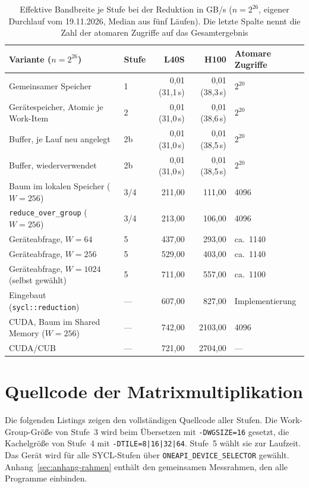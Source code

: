 \documentclass[12pt,a4paper]{article}
\begin{document}
\begin{table}[H]
\centering
\footnotesize
\setlength{\tabcolsep}{4pt}
\caption[Leistung je Stufe bei der Reduktion (GB/s)]{Effektive Bandbreite je Stufe bei der Reduktion in GB/s ($n = 2^{26}$, eigener Durchlauf vom 19.11.2026, Median aus fünf Läufen). Die letzte Spalte nennt die Zahl der atomaren Zugriffe auf das Gesamtergebnis}
\label{tab:reduktion_stufen}
\begin{tabular}{@{}llrrl@{}}
\toprule
Variante ($n = 2^{26}$) & Stufe & L40S & H100 & Atomare Zugriffe \\
\midrule
Gemeinsamer Speicher                  & 1  & 0,01 (31,1\,s) & 0,01 (38,3\,s) & $2^{20}$ \\
Gerätespeicher, Atomic je Work-Item   & 2  & 0,01 (31,0\,s) & 0,01 (38,6\,s) & $2^{20}$ \\
Buffer, je Lauf neu angelegt          & 2b & 0,01 (31,0\,s) & 0,01 (38,5\,s) & $2^{20}$ \\
Buffer, wiederverwendet               & 2b & 0,01 (31,0\,s) & 0,01 (38,5\,s) & $2^{20}$ \\
Baum im lokalen Speicher ($W = 256$)  & 3/4 & 211,00 &  111,00 & 4096 \\
\texttt{reduce\_over\_group} ($W = 256$) & 3/4 & 213,00 &  106,00 & 4096 \\
Geräteabfrage, $W = 64$               & 5  & 437,00 &  293,00 & ca.\ 1140 \\
Geräteabfrage, $W = 256$              & 5  & 529,00 &  403,00 & ca.\ 1140 \\
Geräteabfrage, $W = 1024$ (selbst gewählt) & 5 & 711,00 & 557,00 & ca.\ 1100 \\
Eingebaut (\texttt{sycl::reduction})  & --- & 607,00 &  827,00 & Implementierung \\
\midrule
CUDA, Baum im Shared Memory ($W = 256$) & --- & 742,00 & 2103,00 & 4096 \\
CUDA/CUB                                & --- & 721,00 & 2704,00 & --- \\
\bottomrule
\end{tabular}
\end{table}


\newpage
{}
\section{Quellcode der Matrixmultiplikation}\label{sec:anhang}

Die folgenden Listings zeigen den vollständigen Quellcode aller Stufen. Die
Work-Group-Größe von Stufe~3 wird beim Übersetzen mit \texttt{-DWGSIZE=16}
gesetzt, die Kachelgröße von Stufe~4 mit \texttt{-DTILE=8|16|32|64}. Stufe~5
wählt sie zur Laufzeit. Das Gerät wird für alle SYCL-Stufen über
\texttt{ONEAPI\_DEVICE\_SELECTOR} gewählt. Anhang~\ref{sec:anhang-rahmen}
enthält den gemeinsamen Messrahmen, den alle Programme einbinden.
\end{document}
